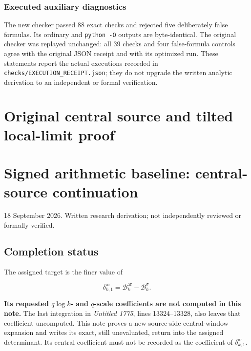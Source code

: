 \subsubsection{Executed auxiliary diagnostics}\label{loc:executed-auxiliary-diagnostics}

The new checker passed 88 exact checks and rejected five deliberately false formulas. Its ordinary and \texttt{python\ -O} outputs are byte-identical. The original checker was replayed unchanged: all 39 checks and four false-formula controls agree with the original JSON receipt and with its optimized run. These statements report the actual executions recorded in \texttt{checks/EXECUTION\_RECEIPT.json}; they do not upgrade the written analytic derivation to an independent or formal verification.

\endgroup

\clearpage
\begingroup


\setcounter{equation}{0}
\renewcommand{\theequation}{ACW.\arabic{equation}}
\section*{Original central source and tilted local-limit proof}
\section{Signed arithmetic baseline: central-source continuation}\label{acw:signed-arithmetic-baseline-central-source-continuation}

18 September 2026. Written research derivation; not independently reviewed or formally verified.

\subsection{Completion status}\label{acw:completion-status}

The assigned target is the finer value of

\[
\delta_{k,1}^{\mathrm{ar}}=\mathcal B_k^{\mathrm{ar}}-\mathcal B_k^\sigma.
\]

\textbf{Its requested \(q\log k\)- and \(q\)-scale coefficients are not computed in this note.} The last integration in \emph{Untitled 1775}, lines 13324--13328, also leaves that coefficient uncomputed. This note proves a new source-side central-window expansion and writes its exact, still unevaluated, return into the assigned determinant. Its central coefficient must not be recorded as the coefficient of \(\delta_{k,1}^{\mathrm{ar}}\).

